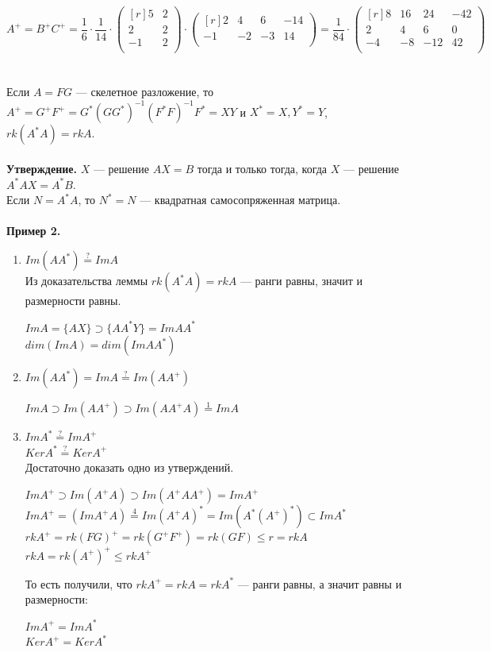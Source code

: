 \documentclass[12pt]{article}
\theoremstyle{definition}
\numberwithin{equation}{section}
\begin{document}
	\[A^+ = B^+C^+ = \frac{1}{6} \cdot \frac{1}{14} \cdot \begin{pmatrix}[r]
	5 & 2 \\         
	2 & 2 \\
	-1 & 2 \\
	\end{pmatrix} \cdot \begin{pmatrix}[r]
	2 & 4 & 6 & -14 \\         
	-1 & -2 & -3 & 14 \\
	\end{pmatrix} = \frac{1}{84} \cdot \begin{pmatrix}[r]
	8 & 16 & 24 & -42 \\         
	2 & 4 & 6 & 0 \\
	-4 & -8 & -12 & 42 \\
	\end{pmatrix}\]\\
	\\
	Если $A=FG$ --- скелетное разложение, то 
	$A^+=G^+F^+=G^*(GG^*)^{-1}(F^*F)^{-1}F^*=XY$ и 
	$X^*=X, Y^*=Y$, 
	$rk(A^*A)=rkA$.\\
	\\
	\textbf{Утверждение.}
	$X$ --- решение $AX=B$ тогда и только тогда, когда $X$ --- решение $A^*AX=A^*B$.\\
	Если $N=A^*A$, то $N^*=N$ --- квадратная самосопряженная матрица.\\
	\\
	\textbf{Пример 2.}\begin{enumerate}
		\item $Im(AA^*)\overset{?}{=}ImA$\\
		Из доказательства леммы $rk(A^*A)=rkA$ --- ранги равны, значит и размерности равны.
		\begin{center} $ImA=\{AX\} \supset \{AA^*Y\}=ImAA^*$\\
			$dim(ImA)=dim(ImAA^*)$
		\end{center}
		\item $Im(AA^*)=ImA\overset{?}{=}Im(AA^+)$
		\begin{center}
			$ImA\supset Im(AA^+) \supset Im(AA^+A) \overset{1}{=} ImA$
		\end{center}
		\item $ImA^* \overset{?}{=} ImA^+$\\
		$KerA^* \overset{?}{=} KerA^+$\\
		Достаточно доказать одно из утверждений.
		\begin{center}
			$ImA^+ \supset Im(A^+A) \supset Im(A^+AA^+) = ImA^+$\\
			$ImA^+=(ImA^+A) \overset{4}{=} Im(A^+A)^* = Im(A^*(A^+)^*) \subset ImA^*$\\
			$rkA^+=rk(FG)^+=rk(G^+F^+)=rk(GF) \leqslant r = rkA$\\
			$rkA=rk(A^+)^+ \leqslant rk A^+$
		\end{center}
		То есть получили, что $rkA^+=rkA=rkA^*$ --- ранги равны, а значит равны и размерности:
		\begin{center}
			$ImA^+=ImA^*$\\
			$KerA^+=KerA^*$
		\end{center}
	\end{enumerate}
\end{document}
